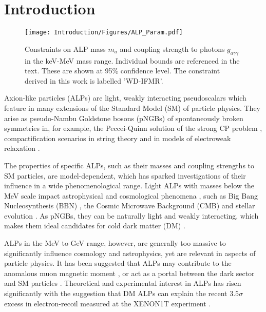 \section{Introduction}
\thispagestyle{plain}
\begin{figure}[b]
    \centering
    \texttt{[image: Introduction/Figures/ALP\_Param.pdf]}
    \caption{Constraints on ALP mass $m_a$ and coupling strength to photons $g_{a\gamma\gamma}$ in the keV-MeV mass range. Individual bounds are referenced in the text. These are shown at 95\% confidence level. The constraint derived in this work is labelled 'WD-IFMR'.}
    \label{fig: ALP_param_space}  
\end{figure}

Axion-like particles (ALPs) are light, weakly interacting pseudoscalars which feature in many extensions of the Standard Model (SM) of particle physics. They arise as pseudo-Nambu Goldstone bosons (pNGBs) of spontaneously broken symmetries in, for example, the Peccei-Quinn solution of the strong CP problem \cite{PQ1, Peccei:1977ur, Weinberg-40.223, Wilczek:1977pj}, compactification scenarios in string theory \cite{Svrcek:2006yi, Arvanitaki:2009fg, Cicoli:2012sz} and in models of electroweak relaxation \cite{Graham:2015cka}. 




The properties of specific ALPs, such as their masses and coupling strengths to SM particles, are model-dependent, which has sparked investigations of their influence in a wide phenomenological range. Light ALPs with masses below the MeV scale impact astrophysical and cosmological phenomena \cite{Cadamuro:2011fd}, such as Big Bang Nucleosynthesis (BBN) \cite{Updated_BBN}, the Cosmic Microwave Background (CMB) and stellar evolution \cite{Raffelt-Bounds-on-light, RAFFELT1982323, Raffelt:1996wa, Ayala:2014pea, Aoyama:2015asa, Carenza:2020zil, Friedland:2012hj, Dominguez, Dominguez:2017mia}. As pNGBs, they can be naturally light and weakly interacting, which makes them ideal candidates for cold dark matter (DM) \cite{Preskill:1982cy, Abbott:1982af, Dine:1982ah, Arias:2012az}. 





ALPs in the MeV to GeV range, however, are generally too massive to significantly influence cosmology and astrophysics, yet are relevant in aspects of particle physics. It has been suggested that ALPs may contribute to the anomalous muon magnetic moment \cite{Chang:2000ii, Bauer:2017nlg, Marciano:2016yhf}, or act as a portal between the dark sector and SM particles \cite{Nomura:2008ru}. Theoretical and experimental interest in ALPs has risen significantly with the suggestion that DM ALPs can explain the recent $3.5\sigma$ excess in electron-recoil measured at the XENON1T experiment \cite{Athron:2020maw, Takahashi:2020uio, Takahashi:2020bpq}.



